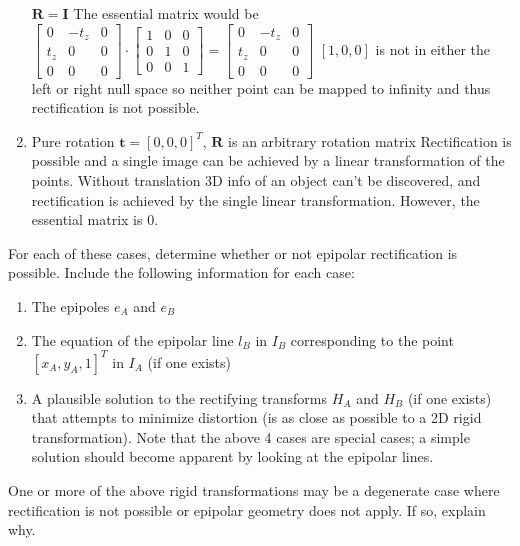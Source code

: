 \documentclass[11pt]{article}
\begin{document}
\begin{enumerate}
  \(\boldsymbol{R} = \boldsymbol{I}\) The essential matrix would be
  \(\begin{bmatrix} 0 & -t_{z} & 0 \\ t_{z} & 0 & 0 \\ 0 & 0 & 0\end{bmatrix} \cdot \begin{bmatrix} 1 & 0 & 0 \\ 0 & 1 & 0 \\ 0 & 0 & 1\end{bmatrix} = \begin{bmatrix} 0 & -t_{z} & 0 \\ t_{z} & 0 & 0 \\ 0 & 0 & 0\end{bmatrix}\)
  \([1, 0 ,0]\) is not in either the left or right null space so neither
  point can be mapped to infinity and thus rectification is not
  possible. 
\item
  Pure rotation \(\boldsymbol{t} = [0, 0, 0]^T\), \(\boldsymbol{R}\) is
  an arbitrary rotation matrix Rectification is possible and a single
  image can be achieved by a linear transformation of the points.
  Without translation 3D info of an object can't be discovered, and
  rectification is achieved by the single linear transformation.
  However, the essential matrix is 0. 
\end{enumerate}

For each of these cases, determine whether or not epipolar rectification
is possible. Include the following information for each case:

\begin{enumerate}
\def\labelenumi{(\roman{enumi})}
\item
  The epipoles \(e_A\) and \(e_B\)
\item
  The equation of the epipolar line \(l_B\) in \(I_B\) corresponding to
  the point \([x_A, y_A, 1]^T\) in \(I_A\) (if one exists)
\item
  A plausible solution to the rectifying transforms \(H_A\) and \(H_B\)
  (if one exists) that attempts to minimize distortion (is as close as
  possible to a 2D rigid transformation). Note that the above 4 cases
  are special cases; a simple solution should become apparent by looking
  at the epipolar lines.
\end{enumerate}

One or more of the above rigid transformations may be a degenerate case
where rectification is not possible or epipolar geometry does not apply.
If so, explain why.
\end{document}
